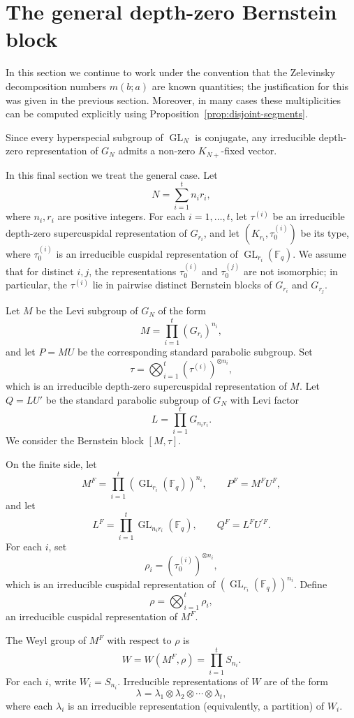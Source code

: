 \documentclass[12pt]{article}
\theoremstyle{remark}
\begin{document}
\section{The general depth-zero Bernstein block}

In this section we continue to work under the convention that the Zelevinsky decomposition numbers $m(b;a)$ are known quantities; the justification for this was given in the previous section. Moreover, in many cases these multiplicities can be computed explicitly using Proposition~\ref{prop:disjoint-segments}.

Since every hyperspecial subgroup of $\operatorname{GL}_N$ is conjugate, any irreducible depth-zero representation of $G_N$ admits a non-zero $K_{N+}$-fixed vector.

In this final section we treat the general case. Let
$$
N = \sum_{i=1}^{t} n_i r_i,
$$
where $n_i, r_i$ are positive integers. For each $i = 1,\dots,t$, let $\tau^{(i)}$ be an irreducible depth-zero supercuspidal representation of $G_{r_i}$, and let $(K_{r_i}, \tau^{(i)}_0)$ be its type, where $\tau^{(i)}_0$ is an irreducible cuspidal representation of $\operatorname{GL}_{r_i}(\mathbb{F}_q)$. We assume that for distinct $i, j$, the representations $\tau^{(i)}_0$ and $\tau^{(j)}_0$ are not isomorphic; in particular, the $\tau^{(i)}$ lie in pairwise distinct Bernstein blocks of $G_{r_i}$ and $G_{r_j}$.

Let $M$ be the Levi subgroup of $G_N$ of the form
$$
M = \prod_{i=1}^{t} (G_{r_i})^{n_i},
$$
and let $P = MU$ be the corresponding standard parabolic subgroup. Set
$$
\tau = \bigotimes_{i=1}^{t} (\tau^{(i)})^{\otimes n_i},
$$
which is an irreducible depth-zero supercuspidal representation of $M$. Let $Q = L U'$ be the standard parabolic subgroup of $G_N$ with Levi factor
$$
L = \prod_{i=1}^{t} G_{n_i r_i}.
$$
We consider the Bernstein block $[M, \tau]$.

On the finite side, let
$$
M^F = \prod_{i=1}^{t} (\operatorname{GL}_{r_i}(\mathbb{F}_q))^{n_i},
\qquad
P^F = M^F U^F,
$$
and let
$$
L^F = \prod_{i=1}^{t} \operatorname{GL}_{n_i r_i}(\mathbb{F}_q),
\qquad
Q^F = L^F U^{\prime F}.
$$
For each $i$, set
$$
\rho_i = (\tau^{(i)}_0)^{\otimes n_i},
$$
which is an irreducible cuspidal representation of $(\operatorname{GL}_{r_i}(\mathbb{F}_q))^{n_i}$. Define
$$
\rho = \bigotimes_{i=1}^{t} \rho_i,
$$
an irreducible cuspidal representation of $M^F$.

The Weyl group of $M^F$ with respect to $\rho$ is
$$
W = W(M^F, \rho) = \prod_{i=1}^{t} S_{n_i}.
$$
For each $i$, write $W_i = S_{n_i}$. Irreducible representations of $W$ are of the form
$$
\lambda = \lambda_1 \otimes \lambda_2 \otimes \cdots \otimes \lambda_t,
$$
where each $\lambda_i$ is an irreducible representation (equivalently, a partition) of $W_i$.
\end{document}
